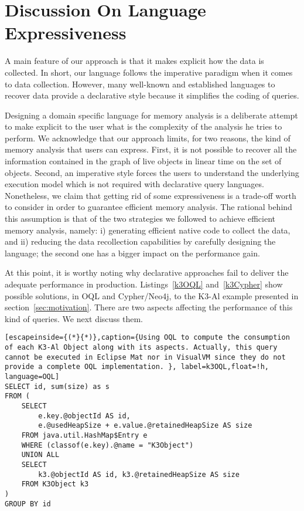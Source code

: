 \section{Discussion On Language Expressiveness}\label{sec:expressiveness}

A main feature of our approach is that it makes explicit how the data is collected.
In short, our language follows the imperative paradigm when it comes to data collection.
However, many well-known and established languages to recover data provide a declarative style because it simplifies the coding of queries.

Designing a domain specific language for memory analysis is a deliberate attempt to make explicit to the user what is the complexity of the analysis he tries to perform.
We acknowledge that our approach limits,  for two reasons, the kind of memory analysis that users can express.
First, it is not possible to recover all the information contained in the graph of live objects in linear time on the set of objects.
Second, an imperative style forces the users to understand the underlying execution model which is not required with declarative query languages.
Nonetheless, we claim that getting rid of some expressiveness is a trade-off worth to consider in order to guarantee efficient memory analysis.
The rational behind this assumption is that of the two strategies we followed to achieve efficient memory analysis, namely: i) generating efficient native code to collect the data, and ii) reducing the data recollection capabilities by carefully designing the language; the second one has a bigger impact on the performance gain.

At this point, it is worthy noting why declarative approaches fail to deliver the adequate performance in production.
Listings~\ref{k3OQL} and~\ref{k3Cypher} show possible solutions, in OQL and Cypher/Neo4j, to the K3-Al example presented in section~\ref{sec:motivation}.
There are two aspects affecting the performance of this kind of queries.
We next discuss them.

\begin{lstlisting}[escapeinside={(*}{*)},caption={Using OQL to compute the consumption of each K3-Al Object along with its aspects. Actually, this query cannot be executed in Eclipse Mat nor in VisualVM since they do not provide a complete OQL implementation. }, label=k3OQL,float=!h, language=OQL]
SELECT id, sum(size) as s
FROM (
	SELECT
		e.key.@objectId AS id, 
		e.@usedHeapSize + e.value.@retainedHeapSize AS size
	FROM java.util.HashMap$Entry e
	WHERE (classof(e.key).@name = "K3Object")
	UNION ALL
	SELECT 
		k3.@objectId AS id, k3.@retainedHeapSize AS size 
	FROM K3Object k3
)
GROUP BY id
\end{lstlisting}

